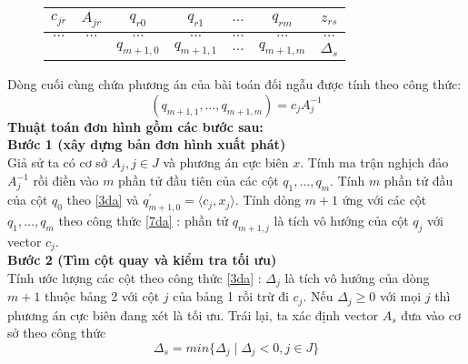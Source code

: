 \documentclass{article}
\begin{document}
\begin{enumerate}
\begin{figure}
\begin{center}
\begin{tabular}{|c|c|c|c|c|c|c|}
                                            \hline
                                            $c_{jr}$ & $A_{jr}$ & $q_{r0}$ & $q_{r1}$ & $\ldots$ & $q_{rm}$ & $z_{rs}$ \\
                                            \hline
                                            $\ldots$ & $\ldots$ & $\ldots$ & $\ldots$ & $\ldots$ & $\ldots$ & $\ldots$ \\
                                            \hline
                                            && $q_{m+1,0}$ & $q_{m+1,1}$ & $\ldots$ & $q_{m+1,m}$ & $\Delta_s$ \\
                                            \hline    
                                        \end{tabular}
                                    \end{center}  
                            \end{figure}  
                        Dòng cuối cùng chứa phương án của bài toán đối ngẫu được tính theo công thức:
                            \begin{equation} \label{7da}
                                (q_{m+1,1},\ldots,q_{m+1,m})=c_jA_j^{-1}
                            \end{equation}
                        \textbf{Thuật toán đơn hình gồm các bước sau:} \\
                            \textbf{Bước 1 (xây dựng bản đơn hình xuất phát)}\\
                                Giả sử ta có cơ sở $A_j,j \in J$ và phương án cực biên $x$. Tính ma trận nghịch đảo $A_j^{-1}$ rồi điền vào $m$ phần tử đầu tiên của các cột $q_1,\ldots,q_m$. Tính $m$ phần tử đầu của cột $q_0$ theo \eqref{3da} và $q_{m+1,0}^{'}=\langle c_j,x_j \rangle$. Tính dòng $m+1$ ứng với các cột $q_1,\ldots,q_m$ theo công thức \eqref{7da} : phần tử $q_{m+1,j}$ là tích vô hướng của cột $q_j$ với vector $c_j$. \\
                            \textbf{Bước 2 (Tìm cột quay và kiểm tra tối ưu)}\\
                                Tính ước lượng các cột theo công thức \eqref{3da} : $\Delta_j$ là tích vô hướng của dòng $m+1$ thuộc bảng 2 với cột $j$ của bảng 1 rồi trừ đi $c_j$. Nếu $\Delta_j \geq 0$ với mọi $j$ thì phương án cực biên đang xét là tối ưu. Trái lại, ta xác định vector $A_s$ đưa vào cơ sở theo công thức
                                    \begin{equation}
                                        \Delta_s = min\{\Delta_j \mid \Delta_j < 0,j \in J \}

\end{equation}
\end{enumerate}
\end{document}
